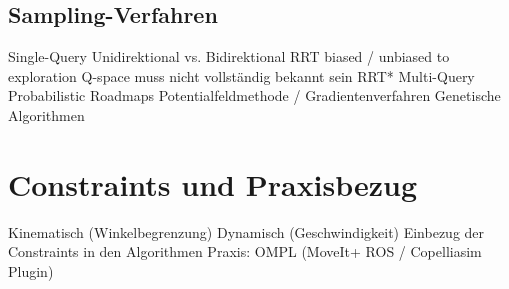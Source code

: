 \subsection{Sampling-Verfahren}
Single-Query
Unidirektional vs. Bidirektional
RRT
biased / unbiased to exploration
Q-space muss nicht vollständig bekannt sein
RRT*
Multi-Query
Probabilistic Roadmaps
Potentialfeldmethode / Gradientenverfahren
Genetische Algorithmen


\section{Constraints und Praxisbezug}
Kinematisch (Winkelbegrenzung)
Dynamisch (Geschwindigkeit)
Einbezug der Constraints in den Algorithmen
Praxis: OMPL (MoveIt+ ROS / Copelliasim Plugin)

